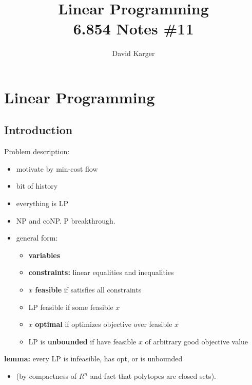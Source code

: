 \documentclass{article}
\title{Linear Programming\\ 6.854 Notes \#11}
\author{David Karger}
\begin{document}

\section{Linear Programming}

\subsection{Introduction}

Problem description:
\begin{itemize}
\item motivate by min-cost flow
\item bit of history
\item everything is LP
\item NP and coNP.   P breakthrough.
\item general form: 
  \begin{itemize}
  \item {\bf variables}
  \item {\bf constraints:} linear equalities and inequalities
  \item $x$ {\bf feasible} if satisfies all constraints
  \item LP feasible if some feasible $x$
  \item $x$ {\bf optimal} if optimizes objective over feasible $x$
  \item LP is {\bf unbounded} if have feasible $x$ of arbitrary good
    objective value
  \end{itemize}
\end{itemize}

{\bf lemma:} every LP is infeasible, has opt, or is unbounded
\begin{itemize}
  \item  (by compactness of $R^n$ and fact that polytopes are closed sets).
\end{itemize}
\end{document}
